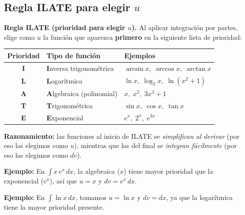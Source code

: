 \documentclass[12pt, letterpaper]{article}
\newcommand{\dx}{\,dx}
\begin{document}
\vspace{8pt}

\subsection{Regla ILATE para elegir $u$}

\begin{cuadroextra}
\textbf{Regla ILATE (prioridad para elegir $u$).}\quad
Al aplicar integración por partes, elige como $u$ la función que aparezca
\textbf{primero} en la siguiente lista de prioridad:

\vspace{6pt}
\begin{center}
\renewcommand{\arraystretch}{1.5}
\begin{tabular}{c l l}
  \toprule
  \textbf{Prioridad} & \textbf{Tipo de función} & \textbf{Ejemplos} \\
  \midrule
  \textbf{I} & \textbf{I}nversa trigonométrica & $\arcsin x,\;\arccos x,\;\arctan x$ \\
  \textbf{L} & \textbf{L}ogarítmica & $\ln x,\;\log_2 x,\;\ln(x^2+1)$ \\
  \textbf{A} & \textbf{A}lgebraica (polinomial) & $x,\;x^2,\;3x^3+1$ \\
  \textbf{T} & \textbf{T}rigonométrica & $\sin x,\;\cos x,\;\tan x$ \\
  \textbf{E} & \textbf{E}xponencial & $e^x,\;2^x,\;e^{3x}$ \\
  \bottomrule
\end{tabular}
\end{center}

\vspace{6pt}
\small
\textbf{Razonamiento:} las funciones al inicio de ILATE se \textit{simplifican al derivar}
(por eso las elegimos como $u$), mientras que las del final se \textit{integran fácilmente}
(por eso las elegimos como $dv$).

\vspace{4pt}
\textbf{Ejemplo:} En $\displaystyle\int x\,e^x\dx$, la algebraica ($x$) tiene mayor
prioridad que la exponencial ($e^x$), así que $u = x$ y $dv = e^x\dx$.

\vspace{4pt}
\textbf{Ejemplo:} En $\displaystyle\int \ln x\dx$, tomamos $u = \ln x$ y $dv = dx$,
ya que la logarítmica tiene la mayor prioridad presente.
\end{cuadroextra}
\end{document}
